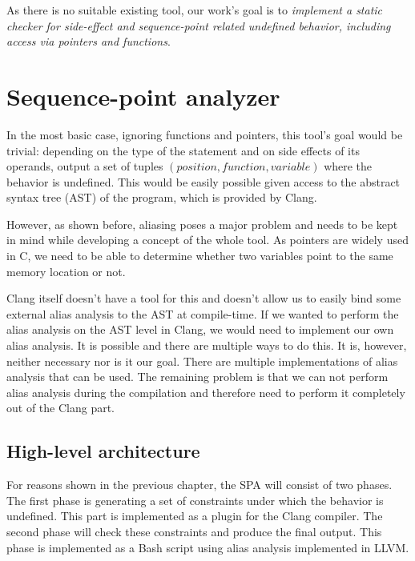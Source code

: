 As there is no suitable existing tool, our work's goal is to \emph{implement a static checker for side-effect and sequence-point related undefined behavior, including access via pointers and functions}.

\chapter{Sequence-point analyzer}
In the most basic case, ignoring functions and pointers, this tool's goal would be trivial: depending on the type of the statement and on side effects of its operands, output a set of tuples $(position, function, variable)$ where the behavior is undefined. This would be easily possible given access to the abstract syntax tree (AST) of the program, which is provided by Clang.

However, as shown before, aliasing poses a major problem and needs to be kept in mind while developing a concept of the whole tool. As pointers are widely used in C, we need to be able to determine whether two variables point to the same memory location or not.

Clang itself doesn't have a tool for this and doesn't allow us to easily bind some external alias analysis to the AST at compile-time. If we wanted to perform the alias analysis on the AST level in Clang, we would need to implement our own alias analysis. It is possible and there are multiple ways to do this. It is, however, neither necessary nor is it our goal. There are multiple implementations  of alias analysis that can be used. The remaining problem is that we can not perform alias analysis during the compilation and therefore need to perform it completely out of the Clang part.

\section{High-level architecture}
For reasons shown in the previous chapter, the SPA will consist of two phases. The first phase is generating a set of constraints under which the behavior is undefined. This part is implemented as a plugin for the Clang compiler. The second phase will check these constraints and produce the final output. This phase is implemented as a Bash script using alias analysis implemented in LLVM.

